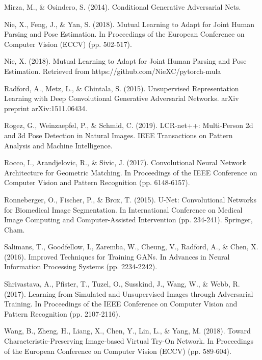 \documentclass[11pt]{article}
\begin{document}
\begin{thebibliography}{34}
 Mirza, M., \& Osindero, S. (2014). Conditional Generative Adversarial Nets.
 
Nie, X., Feng, J., \& Yan, S. (2018). Mutual Learning to Adapt for Joint Human Parsing and Pose Estimation. In Proceedings of the European Conference on Computer Vision (ECCV) (pp. 502-517).

Nie, X. (2018). Mutual Learning to Adapt for Joint Human Parsing and Pose Estimation. Retrieved from
https://github.com/NieXC/pytorch-mula

Radford, A., Metz, L., \& Chintala, S. (2015). Unsupervised Representation Learning with Deep Convolutional Generative Adversarial Networks. arXiv preprint arXiv:1511.06434.

Rogez, G., Weinzaepfel, P., \& Schmid, C. (2019). LCR-net++: Multi-Person 2d and 3d Pose Detection in Natural Images. IEEE Transactions on Pattern Analysis and Machine Intelligence.

Rocco, I., Arandjelovic, R., \& Sivic, J. (2017). Convolutional Neural Network Architecture for Geometric Matching. In Proceedings of the IEEE Conference on Computer Vision and Pattern Recognition (pp. 6148-6157).

Ronneberger, O., Fischer, P., \& Brox, T. (2015). U-Net: Convolutional Networks for Biomedical Image Segmentation. In International Conference on Medical Image Computing and Computer-Assisted Intervention (pp. 234-241). Springer, Cham.

Salimans, T., Goodfellow, I., Zaremba, W., Cheung, V., Radford, A., \& Chen, X. (2016). Improved Techniques for Training GANs. In Advances in Neural Information Processing Systems (pp. 2234-2242).

Shrivastava, A., Pfister, T., Tuzel, O., Susskind, J., Wang, W., \& Webb, R. (2017). Learning from Simulated and Unsupervised Images through Adversarial Training. In Proceedings of the IEEE Conference on Computer Vision and Pattern Recognition (pp. 2107-2116).

Wang, B., Zheng, H., Liang, X., Chen, Y., Lin, L., \& Yang, M. (2018). Toward Characteristic-Preserving Image-based Virtual Try-On Network. In Proceedings of the European Conference on Computer Vision (ECCV) (pp. 589-604).


\end{thebibliography}
\end{document}
